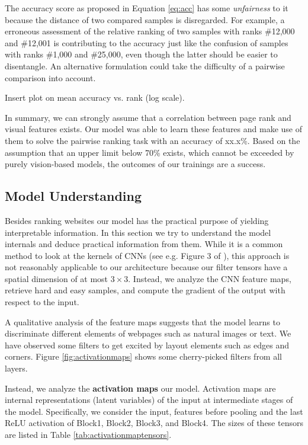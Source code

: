 The accuracy score as proposed in Equation \ref{eq:acc} has some \textit{unfairness} to it because the distance of two compared samples is disregarded. For example, a erroneous assessment of the relative ranking of two samples with ranks \#12,000 and \#12,001 is contributing to the accuracy just like the confusion of samples with ranks \#1,000 and \#25,000, even though the latter should be easier to disentangle. An alternative formulation could take the difficulty of a pairwise comparison into account.

Insert plot on mean accuracy vs. rank (log scale).

In summary, we can strongly assume that a correlation between page rank and visual features exists. Our model was able to learn these features and make use of them to solve the pairwise ranking task with an accuracy of xx.x\%. Based on the assumption that an upper limit below 70\% exists, which cannot be exceeded by purely vision-based models, the outcomes of our trainings are a success.

\subsection{Model Understanding}

Besides ranking websites our model has the practical purpose of yielding interpretable information. In this section we try to understand the model internals and deduce practical information from them. While it is a common method to look at the kernels of CNNs (see e.g. Figure 3 of \cite{krizhevsky:imagenet}), this approach is not reasonably applicable to our architecture because our filter tensors have a spatial dimension of at most $3\times3$. Instead, we analyze the CNN feature maps, retrieve hard and easy samples, and compute the gradient of the output with respect to the input.

A qualitative analysis of the feature maps suggests that the model learns to discriminate different elements of webpages such as natural images or text. We have observed some filters to get excited by layout elements such as edges and corners. Figure \ref{fig:activationmaps} shows some cherry-picked filters from all layers.

Instead, we analyze the \textbf{activation maps} our model. Activation maps are internal representations (latent variables) of the input at intermediate stages of the model. Specifically, we consider the input, features before pooling and the last ReLU activation of Block1, Block2, Block3, and Block4. The sizes of these tensors are listed in Table \ref{tab:activationmaptensors}.

